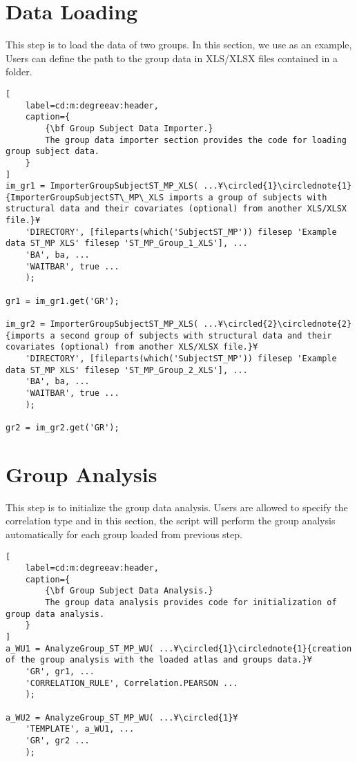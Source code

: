 \documentclass{tufte-handout}
\begin{document}
\section{Data Loading}
This step is to load the data of two groups. In this section, we use  as an example, Users can define the path to the group data in XLS/XLSX files contained in a folder.
\begin{lstlisting}[
	label=cd:m:degreeav:header,
	caption={
		{\bf Group Subject Data Importer.}
		The group data importer section provides the code for loading group subject data.
	}
]
im_gr1 = ImporterGroupSubjectST_MP_XLS( ...¥\circled{1}\circlednote{1}{ImporterGroupSubjectST\_MP\_XLS imports a group of subjects with structural data and their covariates (optional) from another XLS/XLSX file.}¥
    'DIRECTORY', [fileparts(which('SubjectST_MP')) filesep 'Example data ST_MP XLS' filesep 'ST_MP_Group_1_XLS'], ...
    'BA', ba, ...
    'WAITBAR', true ...
    );

gr1 = im_gr1.get('GR');

im_gr2 = ImporterGroupSubjectST_MP_XLS( ...¥\circled{2}\circlednote{2}{imports a second group of subjects with structural data and their covariates (optional) from another XLS/XLSX file.}¥
    'DIRECTORY', [fileparts(which('SubjectST_MP')) filesep 'Example data ST_MP XLS' filesep 'ST_MP_Group_2_XLS'], ...
    'BA', ba, ...
    'WAITBAR', true ...
    );

gr2 = im_gr2.get('GR');

\end{lstlisting}
\clearpage

\section{Group Analysis}
This step is to initialize the group data analysis. Users are allowed to specify the correlation type and   in this section, the script will perform the group analysis automatically for each group loaded from previous step.
\begin{lstlisting}[
	label=cd:m:degreeav:header,
	caption={
		{\bf Group Subject Data Analysis.}
		The group data analysis provides code for initialization of group data analysis.
	}
]
a_WU1 = AnalyzeGroup_ST_MP_WU( ...¥\circled{1}\circlednote{1}{creation of the group analysis with the loaded atlas and groups data.}¥
    'GR', gr1, ...
    'CORRELATION_RULE', Correlation.PEARSON ...
    );

a_WU2 = AnalyzeGroup_ST_MP_WU( ...¥\circled{1}¥
    'TEMPLATE', a_WU1, ...
    'GR', gr2 ...
    );

\end{lstlisting}
\end{document}
